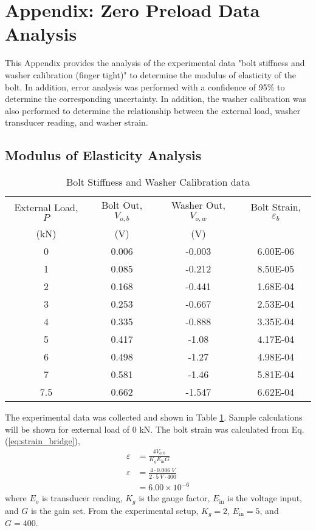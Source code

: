 \section{Appendix: Zero Preload Data Analysis}
\label{app:zero_preload_analysis}
This Appendix provides the analysis of the experimental data "bolt stiffness and washer calibration (finger tight)" to determine the modulus of elasticity of the bolt. In addition, error analysis was performed with a confidence of 95\% to determine the corresponding uncertainty. In addition, the washer calibration was also performed to determine the relationship between the external load, washer transducer reading, and washer strain.

\subsection{Modulus of Elasticity Analysis}
\begin{table}[h]
    \centering
    \caption{Bolt Stiffness and Washer Calibration data}
    \label{tab:modulus_of_elasticity_data}
    \begin{tabular}{cccc}
    \toprule
    External Load, $P$ & Bolt Out, $V_{o, b}$ & Washer Out, $V_{o, w}$ & Bolt Strain, $\varepsilon_b$ \\
    (kN) & (V) & (V) & \\
    \midrule
    0 & 0.006 & -0.003 & 6.00E-06 \\
    1 & 0.085 & -0.212 & 8.50E-05 \\
    2 & 0.168 & -0.441 & 1.68E-04 \\
    3 & 0.253 & -0.667 & 2.53E-04 \\
    4 & 0.335 & -0.888 & 3.35E-04 \\
    5 & 0.417 & -1.08 & 4.17E-04 \\
    6 & 0.498 & -1.27 & 4.98E-04 \\
    7 & 0.581 & -1.46 & 5.81E-04 \\
    7.5 & 0.662 & -1.547 & 6.62E-04 \\
    \bottomrule
    \end{tabular}
\end{table}
The experimental data was collected and shown in Table \ref{tab:modulus_of_elasticity_data}. Sample calculations will be shown for external load of 0 kN. The bolt strain was calculated from Eq. (\ref{eq:strain_bridge}),
\begin{align*}
    \varepsilon &= \frac{4 V_{o, b}}{K_g E_{\text{in}} G} \\
    \varepsilon &= \frac{4 \cdot \qty{0.006}{V}}{2 \cdot \qty{5}{V} \cdot 400} \\
    &= 6.00 \times 10^{-6}
\end{align*}
where $E_o$ is transducer reading, $K_g$ is the gauge factor, $E_{\text{in}}$ is the voltage input, and $G$ is the gain set. From the experimental setup, $K_g = 2$, $E_{\text{in}} = 5$, and $G = 400$. 

